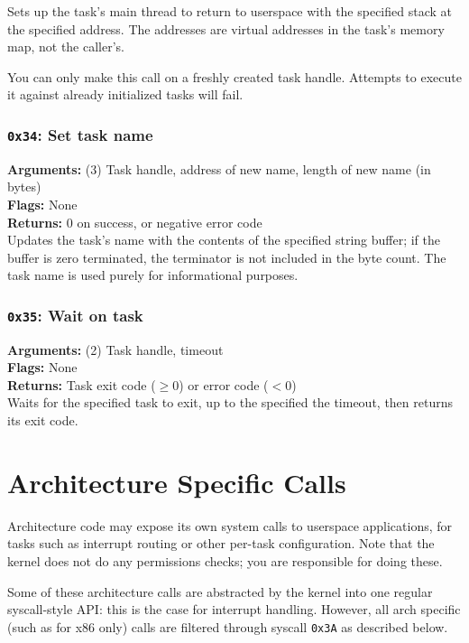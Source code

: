 \documentclass[11pt]{article}
\begin{document}
Sets up the task's main thread to return to userspace with the specified stack at the specified address. The addresses are virtual addresses in the task's memory map, not the caller's.

You can only make this call on a freshly created task handle. Attempts to execute it against already initialized tasks will fail.

\subsubsection{{\tt 0x34}: Set task name}
\textbf{Arguments:} (3) Task handle, address of new name, length of new name (in bytes) \\
\textbf{Flags:} None \\
\textbf{Returns:} 0 on success, or negative error code \\

Updates the task's name with the contents of the specified string buffer; if the buffer is zero terminated, the terminator is not included in the byte count. The task name is used purely for informational purposes.

\subsubsection{{\tt 0x35}: Wait on task}
\textbf{Arguments:} (2) Task handle, timeout \\
\textbf{Flags:} None \\
\textbf{Returns:} Task exit code ($\geq0$) or error code ($<0$) \\

Waits for the specified task to exit, up to the specified the timeout, then returns its exit code.





\section{Architecture Specific Calls}
Architecture code may expose its own system calls to userspace applications, for tasks such as interrupt routing or other per-task configuration. Note that the kernel does not do any permissions checks; you are responsible for doing these.

Some of these architecture calls are abstracted by the kernel into one regular syscall-style API: this is the case for interrupt handling. However, all arch specific (such as for x86 only) calls are filtered through syscall \texttt{0x3A} as described below.
\end{document}
